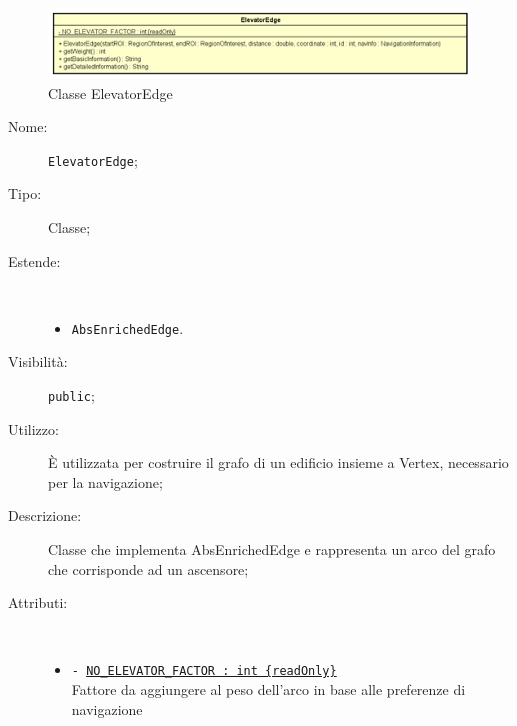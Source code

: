 \documentclass[../DefinizioneDiProdotto.tex]{subfiles}
\begin{document}
    \begin{figure}[H]
        \centering
        \includegraphics{img/ElevatorEdge.png}
        \caption{Classe ElevatorEdge}\label{fig:model::navigator::graph::edge::ElevatorEdge} 
    \end{figure}
    \begin{description}
\item[Nome:] \texttt{ElevatorEdge};
\item[Tipo:] Classe;
\item[Estende:] \
\begin{itemize}
\item \texttt{AbsEnrichedEdge}.
\end{itemize}
\item[Visibilità:] \texttt{public};
\item[Utilizzo:] È utilizzata per costruire il grafo di un edificio insieme a Vertex, necessario per la navigazione;
\item[Descrizione:] Classe che implementa AbsEnrichedEdge e rappresenta un arco del grafo che corrisponde ad un ascensore;
\item[Attributi:] \
\begin{itemize}
\item \texttt{- \underline{NO\_ELEVATOR\_FACTOR : int \{readOnly\}}}\\
Fattore da aggiungere al peso dell'arco in base alle preferenze di navigazione


\end{itemize}
\end{description}
\end{document}
